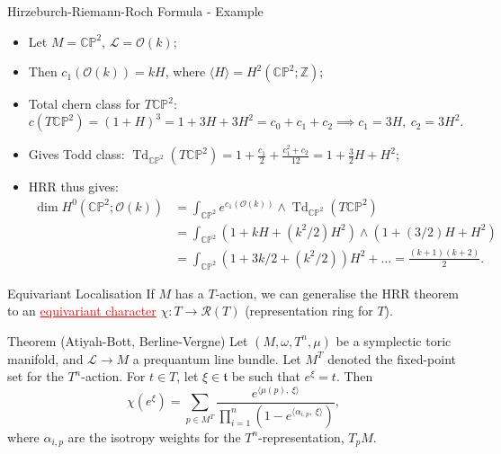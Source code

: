 \documentclass[aspectratio=169,xcolor=dvipsnames]{beamer}
\newcommand{\ra}{\rightarrow}
\newcommand{\ZZ}{\mathbb{Z}}
\newcommand{\CC}{\mathbb{C}}
\newcommand{\PP}{\mathbb{P}}
\newcommand{\Td}{\operatorname{Td}}
\newcommand{\mft}{\mathfrak{t}}
\newcommand{\mc}[1]{\mathcal{#1}}
\newcommand{\mcL}{\mathcal{L}}
\newcommand{\w}{\omega}
\begin{document}
\begin{frame}{Hirzeburch-Riemann-Roch Formula - Example}
	\begin{itemize}
		\item Let $M = \CC\PP^{2}$, $\mcL = \mc{O}(k)$;
		\item Then $c_{1}(\mc{O}(k)) = kH$, where $\langle H \rangle = H^{2}(\CC\PP^{2}; \ZZ)$;
		\item Total chern class for $T\CC\PP^{2}$:
		\[
			c(T\CC\PP^{2}) = (1 + H)^{3} = 1 + 3H + 3H^{2} = c_{0} + c_{1} + c_{2} \implies c_{1} = 3H,~c_{2} = 3H^{2}.
		\]
		\item Gives Todd class: $\Td_{\CC\PP^{2}}(T\CC\PP^{2}) = 1 + \frac{c_{1}}{2} + \frac{c_{1}^{2} + c_{2}}{12} = 1 + \frac{3}{2}H + H^{2};$
		\item HRR thus gives:
		\begin{align*}
				\dim H^{0}(\CC\PP^{2}; \mc{O}(k)) &= \int_{\CC\PP^{2}}e^{c_{1}(\mc{O}(k))} \wedge \Td_{\CC\PP^{2}}(T\CC\PP^{2}) \\ &= \int_{\CC\PP^{2}}\left( 1 + kH + (k^{2}/2)H^{2} \right) \wedge \left(1 + (3/2)H + H^{2}\right) \\ &= \int_{\CC\PP^{2}} \left(1 + 3k/2 + (k^{2}/2)\right)H^{2} + \ldots = \frac{(k+1)(k+2)}{2}.
		\end{align*}
	\end{itemize}
\end{frame}

\begin{frame}{Equivariant Localisation}
	If $M$ has a $T$-action, we can generalise the HRR theorem to an \textcolor{red}{\underline{equivariant character}} $\chi : T \ra \mathcal{R}(T)$ (representation ring for $T$).
	\begin{block}{Theorem (Atiyah-Bott, Berline-Vergne)}
		Let $(M, \w, T^{n}, \mu)$ be a symplectic toric manifold, and $\mcL \ra M$ a prequantum line bundle. Let $M^{T}$ denoted the fixed-point set for the $T^{n}$-action. For $t \in T$, let $\xi \in \mft$ be such that $e^{\xi} = t$.
		\hfill \break
		Then
		\[
			\chi(e^{\xi}) = \sum_{p \in M^{T}} \frac{e^{\langle \mu(p),~\xi\rangle}}{\prod_{i = 1}^{n}\left(1 - e^{\langle \alpha_{i,p},~ \xi \rangle }\right)},
		\]
		where $\alpha_{i,p}$ are the isotropy weights for the $T^{n}$-representation, $T_{p}M$.
	\end{block}
\end{frame}
\end{document}
